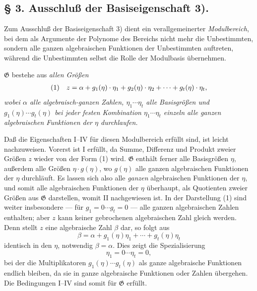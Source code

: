 \subsection*{§ 3. Ausschluß der Basiseigenschaft 3).}

Zum Ausschluß der Basiseigenschaft 3) dient ein verallgemeinerter
\emph{Modulbereich}, bei dem als Argumente der Polynome des Bereichs nicht mehr
die Unbestimmten, sondern alle ganzen algebraischen Funktionen der
Unbestimmten auftreten, während die Unbestimmten selbst
die Rolle der Modulbasis übernehmen.

$\mathfrak G$ bestehe aus \emph{allen Größen}
\[
\begin{array}{@{}l@{\quad}c@{}}
(1)& z=\alpha+g_1(\eta)\cdot\eta_1+g_2(\eta)\cdot\eta_2+\cdots+g_t(\eta)\cdot\eta_t,
\end{array}
\]
\emph{wobei $\alpha$ alle algebraisch-ganzen Zahlen,
$\eta_1\cdots \eta_t$ alle Basisgrößen und $g_1(\eta)\cdots g_t(\eta)$ bei
jeder festen Kombination $\eta_1\cdots\eta_t$ einzeln alle ganzen algebraischen
Funktionen der $\eta$ durchlaufen.}

Daß die Eigenschaften I--IV für diesen Modulbereich erfüllt sind, ist leicht
nachzuweisen. Vorerst ist I erfüllt, da Summe, Differenz und Produkt zweier
Größen $z$ wieder von der Form (1) wird. $\mathfrak G$ enthält ferner alle
Basisgrößen $\eta$, außerdem alle Größen $\eta\cdot g(\eta)$, wo $g(\eta)$ alle
ganzen algebraischen Funktionen der $\eta$ durchläuft. Es lassen sich also alle
\emph{ganzen} algebraischen Funktionen der $\eta$, und somit alle algebraischen
Funktionen der $\eta$ überhaupt, als Quotienten zweier Größen aus $\mathfrak G$
darstellen, womit II nachgewiesen ist. In der Darstellung (1) sind weiter
insbesondere --- für $g_1=0\cdots g_t=0$ --- alle ganzen algebraischen Zahlen
enthalten; aber $z$ kann keiner gebrochenen algebraischen Zahl gleich werden.
Denn stellt $z$ eine algebraische Zahl $\beta$ dar, so folgt aus
\[
 \beta=\alpha+g_1(\eta)\eta_1+\cdots+g_t(\eta)\eta_t
\]
identisch in den $\eta$, notwendig $\beta=\alpha$. Dies zeigt die Spezialisierung
\[
 \eta_1=0\cdots \eta_t=0,
\]
bei der die Multiplikatoren $g_1(\eta)\cdots g_t(\eta)$ als ganze algebraische
Funktionen endlich bleiben, da sie in ganze algebraische Funktionen oder Zahlen
übergehen. Die Bedingungen
I--IV sind somit für $\mathfrak G$ erfüllt.

